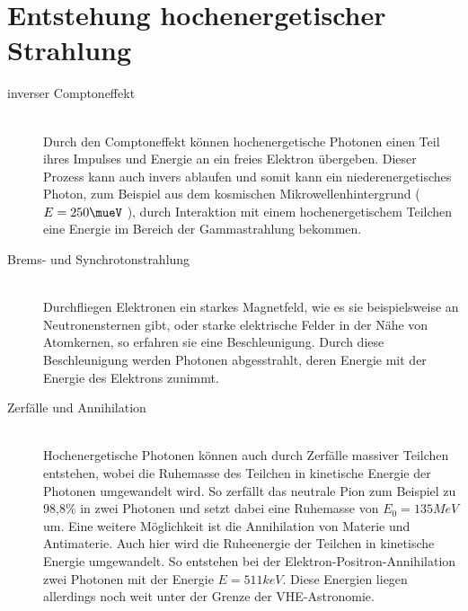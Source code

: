 \section{Entstehung hochenergetischer Strahlung}
\begin{description}
\item[inverser Comptoneffekt]\hfill \\
Durch den Comptoneffekt können hochenergetische Photonen einen Teil ihres Impulses und Energie an ein freies Elektron übergeben. Dieser Prozess kann auch invers ablaufen und somit kann ein niederenergetisches Photon, zum Beispiel aus dem kosmischen Mikrowellenhintergrund ($E=250\unit{\mueV}$ \cite{Grupen}), durch Interaktion mit einem hochenergetischem Teilchen eine Energie im Bereich der Gammastrahlung bekommen.
\item[Brems- und Synchrotonstrahlung]\hfill \\
Durchfliegen Elektronen ein starkes Magnetfeld, wie es sie beispielsweise an Neutronensternen gibt, oder starke elektrische Felder in der Nähe von Atomkernen, so erfahren sie eine Beschleunigung. Durch diese Beschleunigung werden Photonen abgesstrahlt, deren Energie mit der Energie des Elektrons zunimmt.
\item[Zerfälle und Annihilation]\hfill \\ 
Hochenergetische Photonen können auch durch Zerfälle massiver Teilchen entstehen, wobei die Ruhemasse des Teilchen in kinetische Energie der Photonen umgewandelt wird. So zerfällt das neutrale Pion zum Beispiel zu 98,8\%  in zwei Photonen und setzt dabei eine Ruhemasse von $E_0=135\unit{MeV}$ \cite{PDG} um. Eine weitere Möglichkeit ist die Annihilation von Materie und Antimaterie. Auch hier wird die Ruheenergie der Teilchen in kinetische Energie umgewandelt. So entstehen bei der Elektron-Positron-Annihilation zwei Photonen mit der Energie $E=511\unit{keV}$.
Diese Energien liegen allerdings noch weit unter der Grenze der VHE-Astronomie.
\end{description}

